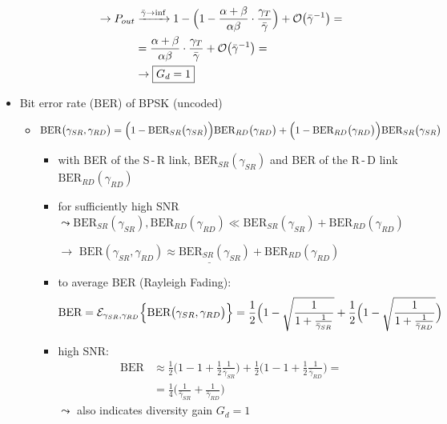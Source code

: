 \documentclass[a4paper, 10pt]{article}
\begin{document}
\begin{itemize}
\begin{itemize}
		\begin{align*}
			\rightarrow P_{out} & \xrightarrow{\bar{\gamma} \rightarrow \inf} 1 - \Bigl(1-\frac{\alpha + \beta}{\alpha\beta}\cdot\frac{\gamma_T}{\bar{\gamma}}\Bigr) + \mathcal{O}\bigl(\bar{\gamma}^{-1}\bigr) = \\ 
			&= \frac{\alpha + \beta}{\alpha\beta}\cdot\frac{\gamma_T}{\bar{\gamma}} + \mathcal{O}\bigl(\bar{\gamma}^{-1}\bigr) = \\
			& \rightarrow \boxed{G_d = 1}
		\end{align*}
	\end{itemize}
	\item Bit error rate (BER) of BPSK (uncoded)
	\begin{itemize}
		\item $\text{BER}\bigl(\gamma_{SR},\gamma_{RD}\bigr) = \Bigl(1 - \text{BER}_{SR}\bigl(\gamma_{SR}\bigl)\Bigl)\text{BER}_{RD}\bigl(\gamma_{RD}\bigr) + \Bigl(1 - \text{BER}_{RD}\bigl(\gamma_{RD}\bigl)\Bigl)\text{BER}_{SR}\bigl(\gamma_{SR}\bigr) $ 
		\begin{itemize}
			\item with BER of the S\,-\,R link, $\text{BER}_{SR}(\gamma_{SR}) $ and BER of the R\,-\,D link $\text{BER}_{RD}(\gamma_{RD}) $ 
			\item for sufficiently high SNR $\leadsto \text{BER}_{SR}(\gamma_{SR}), \text{BER}_{RD}(\gamma_{RD}) \ll \text{BER}_{SR}(\gamma_{SR}) + \text{BER}_{RD}(\gamma_{RD}) $
			\item[$\rightarrow$] $\underline{\text{BER}(\gamma_{SR},\gamma_{RD}) \approx \text{BER}_{SR}(\gamma_{SR}) + \text{BER}_{RD}(\gamma_{RD})} $
			\item to average BER (Rayleigh Fading):
			\begin{align*}
				\text{BER} = \mathcal{E}_{\gamma_{SR},\gamma_{RD}}\Bigl\{\text{BER}\bigl(\gamma_{SR},\gamma_{RD}\bigr)\Bigr\} = \frac{1}{2}\Bigl(1-\sqrt{\frac{1}{1+\frac{1}{\bar{\gamma}_{SR}}}} + \frac{1}{2}\Bigl(1-\sqrt{\frac{1}{1+\frac{1}{\bar{\gamma}_{RD}}}}\Bigr)
			\end{align*}
			\item high SNR: 
			\begin{align*}
				\text{BER} &\approx \frac{1}{2}\bigl(1 - 1 + \frac{1}{2}\frac{1}{\bar{\gamma}_{SR}}\bigr) + \frac{1}{2}\bigl(1 - 1 + \frac{1}{2}\frac{1}{\bar{\gamma}_{RD}}\bigr) = \\ 
				&= \frac{1}{4}\bigl(\frac{1}{\bar{\gamma}_{SR}} + \frac{1}{\bar{\gamma}_{RD}}\bigr)
			\end{align*}
			$\leadsto $ also indicates diversity gain $ G_d = 1 $
		\end{itemize}		 
	\end{itemize}
\end{itemize}
\end{document}
